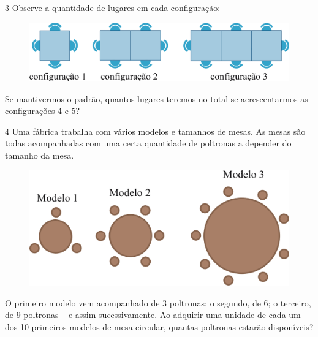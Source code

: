 \num{3} Observe a quantidade de lugares em cada configuração:

\begin{figure}[htpb!]
\centering
\includegraphics[width=\textwidth]{./ilustras-mat/modulo_6-atividade_3.png}
\end{figure}

Se mantivermos o padrão, quantos lugares teremos no total se
acrescentarmos as configurações 4 e 5?

\begin{emptybox}
\end{emptybox}

\num{4} Uma fábrica trabalha com vários modelos e tamanhos de mesas. As mesas
são todas acompanhadas com uma certa quantidade de poltronas a depender
do tamanho da mesa.

\begin{figure}[htpb!]
\centering
\includegraphics[width=\textwidth]{./ilustras-mat/modulo_6-atividade_4.png}
\end{figure}

O primeiro modelo vem acompanhado de 3 poltronas; o segundo, de 6; o 
terceiro, de 9 poltronas -- e assim sucessivamente. Ao adquirir uma
unidade de cada um dos 10 primeiros modelos de mesa circular, quantas
poltronas estarão disponíveis?

